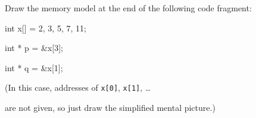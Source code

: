 Draw the memory model at the end of the following code fragment:



\begin{consolethree}[escapeinside=||]



int x[] = {2, 3, 5, 7, 11};



int * p = &x[3];



int * q = &x[1];

\end{consolethree}

(In this case, addresses of \texttt{x[0]}, \texttt{x[1]}, \ldots{}

are not given, so just draw the simplified mental picture.)

